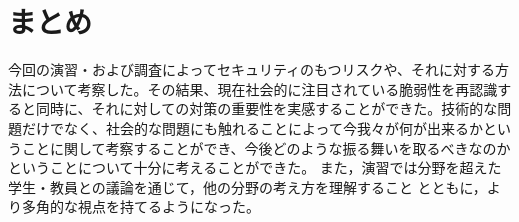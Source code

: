\chapter{まとめ}
今回の演習・および調査によってセキュリティのもつリスクや、それに対する方法について考察した。その結果、現在社会的に注目されている脆弱性を再認識すると同時に、それに対しての対策の重要性を実感することができた。技術的な問題だけでなく、社会的な問題にも触れることによって今我々が何が出来るかということに関して考察することができ、今後どのような振る舞いを取るべきなのかということについて十分に考えることができた。
また，演習では分野を超えた学生・教員との議論を通じて，他の分野の考え方を理解すること
とともに，より多角的な視点を持てるようになった。
